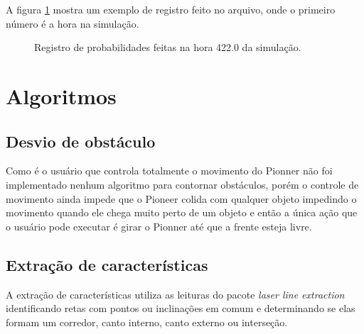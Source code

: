 \documentclass{llncs}
\begin{document}
A figura \ref{fig:prob} mostra um exemplo de registro feito no arquivo, onde o primeiro número é a hora na simulação.

\begin{figure}
\label{fig:prob}
\caption{Registro de probabilidades feitas na hora 422.0 da simulação.}
\centerline{}
\end{figure}


\section{Algoritmos}

\subsection{Desvio de obstáculo}
Como é o usuário que controla totalmente o movimento do Pionner não foi implementado nenhum algoritmo para contornar obstáculos, porém o controle de movimento ainda impede que o Pioneer colida com qualquer objeto impedindo o movimento quando ele chega muito perto de um objeto e então a única ação que o usuário pode executar é girar o Pionner até que a frente esteja livre.

\subsection{Extração de características}
A extração de características utiliza as leituras do pacote \textit{laser line extraction} identificando retas com pontos ou inclinações em comum e determinando se elas formam um corredor, canto interno, canto externo ou interseção.
\end{document}
